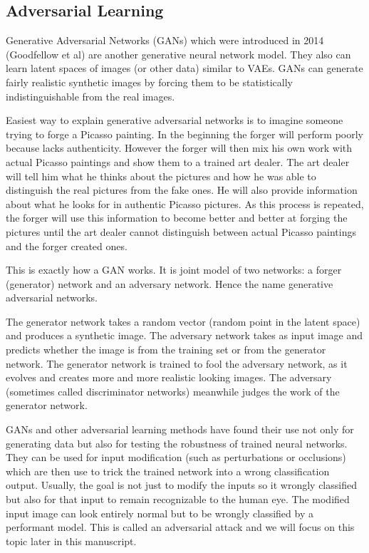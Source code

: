 \documentclass[b5paper]{book}
\begin{document}
\subsection{Adversarial Learning}

Generative Adversarial Networks (GANs) which were introduced in 2014 (Goodfellow et al) are another generative neural network model. They also can learn latent spaces of images (or other data) similar to VAEs. GANs can generate fairly realistic synthetic images by forcing them to be statistically indistinguishable from the real images.

Easiest way to explain generative adversarial networks is to imagine someone trying to forge a Picasso painting. In the beginning the forger will perform poorly because lacks authenticity. However the forger will then mix his own work with actual Picasso paintings and show them to a trained art dealer. The art dealer will tell him what he thinks about the pictures and how he was able to distinguish the real pictures from the fake ones. He will also provide information about what he looks for in authentic Picasso pictures. As this process is repeated, the forger will use this information to become better and better at forging the pictures until the art dealer cannot distinguish between actual Picasso paintings and the forger created ones.

This is exactly how a GAN works. It is joint model of two networks: a forger (generator) network and an adversary network. Hence the name generative adversarial networks.

The generator network takes a random vector (random point in the latent space) and produces a synthetic image. The adversary network takes as input image and predicts whether the image is from the training set or from the generator network. The generator network is trained to fool the adversary network, as it evolves and creates more and more realistic looking images. The adversary (sometimes called discriminator networks) meanwhile judges the work of the generator network.

GANs and other adversarial learning methods have found their use not only for generating data but also for testing the robustness of trained neural networks. They can be used for input modification (such as perturbations or occlusions) which are then use to trick the trained network into a wrong classification output. Usually, the goal is not just to modify the inputs so it wrongly classified but also for that input to remain recognizable to the human eye. The modified input image can look entirely normal but to be wrongly classified by a performant model. This is called an adversarial attack and we will focus on this topic later in this manuscript.
\end{document}
